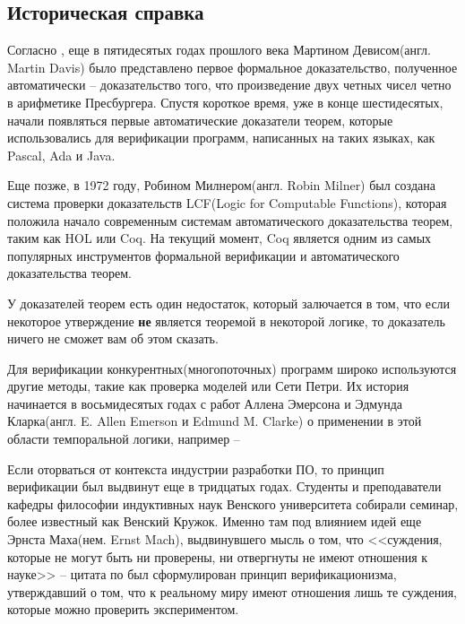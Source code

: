 \subsection{Историческая справка}

Согласно \cite{omodeo2017martin}, еще в пятидесятых годах прошлого века Мартином Девисом(англ. Martin Davis) было представлено первое формальное доказательство, полученное автоматически -- доказательство того, что произведение двух четных чисел четно в арифметике Пресбургера. Спустя короткое время, уже в конце шестидесятых, начали появляться первые автоматические доказатели теорем, которые использовались для верификации программ, написанных на таких языках, как Pascal, Ada и Java.

Еще позже, в 1972 году, Робином Милнером(англ. Robin Milner) был создана система проверки доказательств LCF(Logic for Computable Functions), которая положила начало современным системам автоматического доказательства теорем, таким как HOL или Coq. На текущий момент, Coq является одним из самых популярных инструментов формальной верификации и автоматического доказательства теорем.

У доказателей теорем есть один недостаток, который залючается в том, что если некоторое утверждение \textbf{не} является теоремой в некоторой логике, то доказатель ничего не сможет вам об этом сказать.

Для верификации конкурентных(многопоточных) программ широко используются другие методы, такие как проверка моделей или Сети Петри. Их история начинается в восьмидесятых годах с работ Аллена Эмерсона и Эдмунда Кларка(англ. E. Allen Emerson и Edmund M. Clarke) о применении в этой области темпоральной логики, например -- \cite{Clarke:1981:DSS:648063.747438} 

Если оторваться от контекста индустрии разработки ПО, то принцип верификации был выдвинут еще в тридцатых годах. Студенты и преподаватели кафедры философии индуктивных наук Венского университета собирали семинар, более известный как Венский Кружок. Именно там под влиянием идей еще Эрнста Маха(нем. Ernst Mach), выдвинувшего мысль о том, что <<суждения, которые не могут быть ни проверены, ни отвергнуты не имеют отношения к науке>> -- цитата по \cite{wiki:mach} был сформулирован принцип верификационизма, утверждавший о том, что к реальному миру имеют отношения лишь те суждения, которые можно проверить экспериментом.
